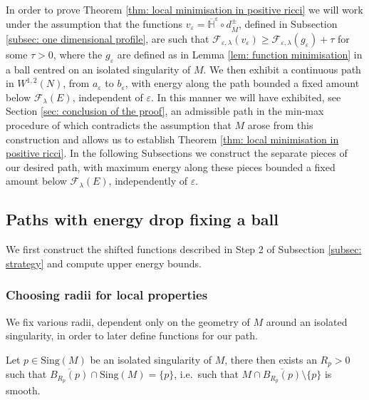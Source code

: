 \documentclass[11pt]{article}
\begin{document}
In order to prove Theorem \ref{thm: local minimisation in positive ricci} we will work under the assumption that the functions $v_\varepsilon = \overline{\mathbb{H}}^\varepsilon \circ d^\pm_{\overline{M}}$, defined in Subsection \ref{subsec: one dimensional profile}, are such that $\mathcal{F}_{\varepsilon,\lambda}(v_\varepsilon) \geq \mathcal{F}_{\varepsilon,\lambda}(g_\varepsilon) + \tau$ for some $\tau > 0$, where the $g_\varepsilon$ are defined as in Lemma \ref{lem: function minimisation} in a ball centred on an isolated singularity of $M$. We then exhibit a continuous path in $W^{1,2}(N)$, from $a_\varepsilon$ to $b_\varepsilon$, with energy along the path bounded a fixed amount below $\mathcal{F}_\lambda(E)$, independent of $\varepsilon$. In this manner we will have exhibited, see Section \ref{sec: conclusion of the proof}, an admissible path in the min-max procedure of \cite{bellettini-wickramasekera} which contradicts the assumption that $M$ arose from this construction and allows us to establish Theorem \ref{thm: local minimisation in positive ricci}. In the following Subsections we construct the separate pieces of our desired path, with maximum energy along these pieces bounded a fixed amount below $\mathcal{F}_\lambda(E)$, independently of $\varepsilon$.

\subsection{Paths with energy drop fixing a ball}
\label{subsec: shifted paths}

We first construct the shifted functions described in Step 2 of Subsection \ref{subsec: strategy} and compute upper energy bounds.

\subsubsection{Choosing radii for local properties}\label{subsec: choosing radii}

We fix various radii, dependent only on the geometry of $M$ around an isolated singularity, in order to later define functions for our path.

\bigskip

Let $p \in \mathrm{Sing}(M)$ be an isolated singularity of $M$, there then exists an $R_p > 0$ such that $\overline{B_{R_p}(p)} \cap \mathrm{Sing}(M) = \{p\}$, i.e.~such that $M \cap \overline{B_{R_p}(p)} \setminus \{p\}$ is smooth. 

\bigskip
\end{document}
